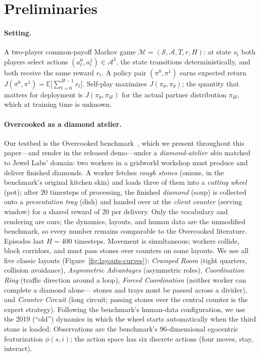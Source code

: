 \documentclass[11pt]{article}
\begin{document}
\section{Preliminaries}
\label{sec:prelim}

\paragraph{Setting.}
A two-player common-payoff Markov game
$\mathcal{M}=(\mathcal{S},\mathcal{A},T,r,H)$: at state $s_t$ both players
select actions $(a^0_t,a^1_t)\in\mathcal{A}^2$, the state transitions
deterministically, and both receive the same reward $r_t$. A policy pair
$(\pi^0,\pi^1)$ earns expected return
$J(\pi^0,\pi^1)=\mathbb{E}\big[\sum_{t=0}^{H-1} r_t\big]$. Self-play
maximizes $J(\pi_\theta,\pi_\theta)$; the quantity that matters for
deployment is $J(\pi_\theta,\pi_H)$ for the actual partner distribution
$\pi_H$, which at training time is unknown.

\paragraph{Overcooked as a diamond atelier.}
Our testbed is the Overcooked benchmark~\citep{carroll2019utility}, which
we present throughout this paper---and render in the released demo---under
a \emph{diamond-atelier skin} matched to Jewel Labs' domain: two workers in
a gridworld workshop must produce and deliver finished diamonds. A worker
fetches \emph{rough stones} (onions, in the benchmark's original kitchen
skin) and loads three of them into a \emph{cutting wheel} (pot); after 20
timesteps of processing, the finished \emph{diamond} (soup) is collected
onto a \emph{presentation tray} (dish) and handed over at the
\emph{client counter} (serving window) for a shared reward of 20 per
delivery. Only the vocabulary and rendering are ours; the dynamics,
layouts, and human data are the unmodified benchmark, so every number
remains comparable to the Overcooked literature. Episodes last $H=400$
timesteps. Movement is simultaneous; workers collide, block corridors, and
must pass stones over counters on some layouts. We use all five classic
layouts (Figure~\ref{fig:layouts-curves}):
\emph{Cramped Room} (tight quarters, collision avoidance),
\emph{Asymmetric Advantages} (asymmetric roles),
\emph{Coordination Ring} (traffic direction around a loop),
\emph{Forced Coordination} (neither worker can complete a diamond alone---
stones and trays must be passed across a divider), and
\emph{Counter Circuit} (long circuit; passing stones over the central
counter is the expert strategy). Following the benchmark's human-data
configuration, we use the 2019 (``old'') dynamics in which the wheel
starts automatically when the third stone is loaded. Observations are the
benchmark's 96-dimensional egocentric featurization
$\phi(s,i)$; the action space has six discrete actions (four moves, stay,
interact).
\end{document}
